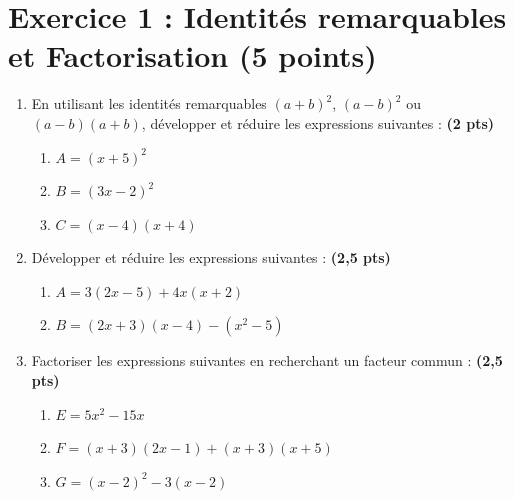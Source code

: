 \documentclass[12pt,a4paper]{article}
\begin{document}
\renewcommand{\arraystretch}{1.5}
\renewcommand{\arrayrulewidth}{1.2pt}
\vspace{3cm}
\section*{Exercice 1 : Identités remarquables et Factorisation (5 points)}
\begin{enumerate}
    \item En utilisant les identités remarquables $(a+b)^2$, $(a-b)^2$ ou $(a-b)(a+b)$, développer et réduire les expressions suivantes : \textbf{(2 pts)}
    \begin{enumerate}
        \item $A = (x + 5)^2$
        \item $B = (3x - 2)^2$
        \item $C = (x - 4)(x + 4)$
    \end{enumerate}
    
    \item Développer et réduire les expressions suivantes : \textbf{(2,5 pts)}
    \begin{enumerate}
        \item $A = 3(2x - 5) + 4x(x + 2)$
        \item $B = (2x + 3)(x - 4) - (x^2 - 5)$
    \end{enumerate}

    \item Factoriser les expressions suivantes en recherchant un facteur commun : \textbf{(2,5 pts)}
    \begin{enumerate}
        \item $E = 5x^2 - 15x$
        \item $F = (x + 3)(2x - 1) + (x + 3)(x + 5)$
        \item $G = (x - 2)^2 - 3(x - 2)$
    \end{enumerate}
\end{enumerate}
\end{document}
